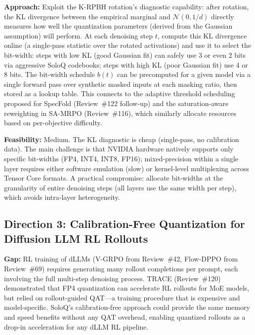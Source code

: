 \documentclass[11pt,a4paper]{article}
\begin{document}
\textbf{Approach:} Exploit the K-RPBH rotation's diagnostic capability: after rotation, the KL divergence between the empirical marginal and $\mathcal{N}(0, 1/d)$ directly measures how well the quantization parameters (derived from the Gaussian assumption) will perform. At each denoising step $t$, compute this KL divergence online (a single-pass statistic over the rotated activations) and use it to select the bit-width: steps with low KL (good Gaussian fit) can safely use 3 or even 2 bits via aggressive SoloQ codebooks; steps with high KL (poor Gaussian fit) use 4 or 8 bits. The bit-width schedule $b(t)$ can be precomputed for a given model via a single forward pass over synthetic masked inputs at each masking ratio, then stored as a lookup table. This connects to the adaptive threshold scheduling proposed for SpecFold (Review~\#122 follow-up) and the saturation-aware reweighting in SA-MRPO (Review~\#116), which similarly allocate resources based on per-objective difficulty.

\textbf{Feasibility:} Medium. The KL diagnostic is cheap (single-pass, no calibration data). The main challenge is that NVIDIA hardware natively supports only specific bit-widths (FP4, INT4, INT8, FP16); mixed-precision within a single layer requires either software emulation (slow) or kernel-level multiplexing across Tensor Core formats. A practical compromise: allocate bit-widths at the granularity of entire denoising steps (all layers use the same width per step), which avoids intra-layer heterogeneity.

\subsection{Direction 3: Calibration-Free Quantization for Diffusion LLM RL Rollouts}
\textbf{Gap:} RL training of dLLMs (V-GRPO from Review~\#42, Flow-DPPO from Review~\#69) requires generating many rollout completions per prompt, each involving the full multi-step denoising process. TRACE (Review~\#120) demonstrated that FP4 quantization can accelerate RL rollouts for MoE models, but relied on rollout-guided QAT---a training procedure that is expensive and model-specific. SoloQ's calibration-free approach could provide the same memory and speed benefits without any QAT overhead, enabling quantized rollouts as a drop-in acceleration for any dLLM RL pipeline.
\end{document}
